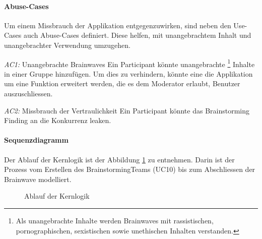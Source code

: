 \paragraph{Abuse-Cases}
Um einem Missbrauch der Applikation entgegenzuwirken, sind neben den Use-Cases auch Abuse-Cases definiert. Diese helfen, mit unangebrachtem Inhalt und unangebrachter Verwendung umzugehen.
\begin{basedescript}{%
		\desclabelstyle{\multilinelabel}
		\desclabelwidth{4.5cm}}
	\item[\textit{AC1: }Unangebrachte Brainwaves] Ein Participant könnte unangebrachte \footnote{Als unangebrachte Inhalte werden Brainwaves mit rassistischen, pornographischen, sexistischen sowie unethischen Inhalten verstanden.} Inhalte in einer Gruppe hinzufügen. Um dies zu verhindern, könnte eine die Applikation um eine Funktion erweitert werden, die es dem Moderator erlaubt, Benutzer auszuschliessen.
	
	\item[\textit{AC2: }Missbrauch der Vertraulichkeit] Ein Participant könnte das Brainstorming Finding an die Konkurrenz leaken. 
\end{basedescript}

\paragraph{Sequenzdiagramm}
Der Ablauf der Kernlogik ist der Abbildung \ref{fig:seq-methode635} zu entnehmen. Darin ist der Prozess vom Erstellen des BrainstormingTeams (UC10) bis zum Abschliessen der Brainwave modelliert.
\begin{figure}[h]
	\centering
	\caption{Ablauf der Kernlogik}
	\label{fig:seq-methode635}
\end{figure}


